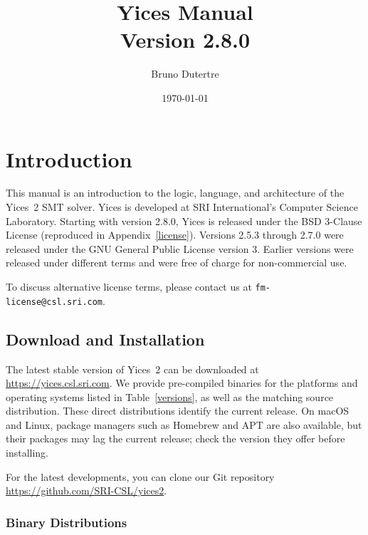 \documentclass[11pt,twoside,fleqn,openright,titlepage]{cslreport}
\begin{document}
\begin{titlepage}
\date{\today}
\author{Bruno Dutertre}
\title{\textbf{Yices Manual\\[0.6em]
Version 2.8.0}}
\end{titlepage}

\maketitle
\cleardoublepageblank
\tableofcontents
\cleardoublepage
\setcounter{page}{0}


\chapter{Introduction}

This  manual   is  an  introduction   to  the  logic,   language,  and
architecture  of the Yices~2 SMT  solver. Yices  is developed  at SRI
International's Computer Science Laboratory. Starting with version
2.8.0, Yices is released under the BSD 3-Clause License (reproduced in
Appendix~\ref{license}). Versions 2.5.3 through 2.7.0 were released
under the GNU General Public License version 3. Earlier versions were
released under different terms and were free of charge for
non-commercial use.

\medskip\noindent
To discuss alternative license terms, please contact us at
\texttt{fm-license@csl.sri.com}.


\section{Download and Installation}

The latest stable version of Yices~2 can be downloaded at
\url{https://yices.csl.sri.com}. We provide pre-compiled binaries for
the platforms and operating systems listed in Table~\ref{versions}, as
well as the matching source distribution. These direct distributions
identify the current release. On macOS and Linux, package managers such
as Homebrew and APT are also available, but their packages may lag the
current release; check the version they offer before installing.

\medskip\noindent
For the latest developments, you can clone our Git repository
\url{https://github.com/SRI-CSL/yices2}.


\subsection{Binary Distributions}
\end{document}
